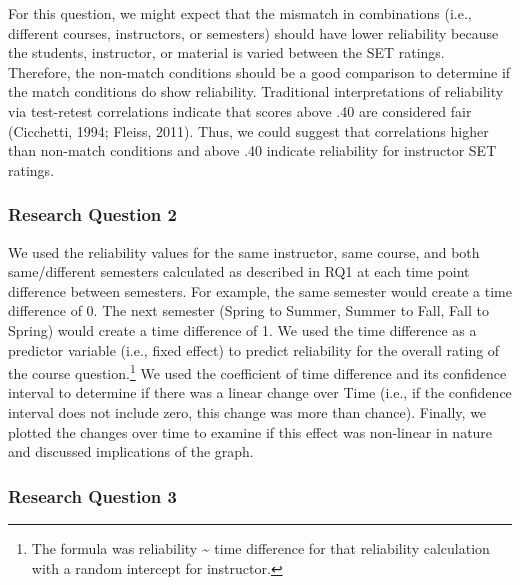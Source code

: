 \documentclass[
  man,mask]{apa7}
\begin{document}
For this question, we might expect that the mismatch in combinations
(i.e., different courses, instructors, or semesters) should have lower
reliability because the students, instructor, or material is varied
between the SET ratings. Therefore, the non-match conditions should be a
good comparison to determine if the match conditions do show
reliability. Traditional interpretations of reliability via test-retest
correlations indicate that scores above .40 are considered fair
(Cicchetti, 1994; Fleiss, 2011). Thus, we could suggest that correlations
higher than non-match conditions and above .40 indicate reliability for
instructor SET ratings.

\subsubsection{Research Question 2}\label{research-question-2}

We used the reliability values for the same instructor, same course, and
both same/different semesters calculated as described in RQ1 at each
time point difference between semesters. For example, the same semester
would create a time difference of 0. The next semester (Spring to
Summer, Summer to Fall, Fall to Spring) would create a time difference
of 1. We used the time difference as a predictor variable (i.e., fixed
effect) to predict reliability for the overall rating of the course
question.\footnote{The formula was reliability \textasciitilde{} time difference for that
  reliability calculation with a random intercept for instructor.} We
used the coefficient of time difference and its confidence interval to
determine if there was a linear change over Time (i.e., if the
confidence interval does not include zero, this change was more than
chance). Finally, we plotted the changes over time to examine if this
effect was non-linear in nature and discussed implications of the graph.

\subsubsection{Research Question 3}\label{research-question-3}
\end{document}
